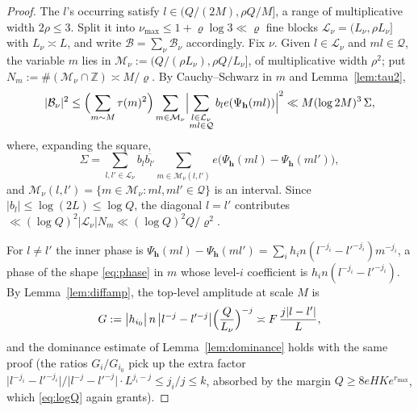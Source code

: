 \documentclass[11pt]{article}
\theoremstyle{definition}
\theoremstyle{plain}
\begin{document}
\begin{proof}
The $l$'s occurring satisfy $l\in(Q/(2M),\rho Q/M]$, a range of
multiplicative width $2\rho\le3$.  Split it into
$\nu_{\max}\le1+\varrho\log3\ll\varrho$ fine blocks
$\mathcal L_{\nu}=(L_{\nu},\rho L_{\nu}]$ with $L_{\nu}\asymp L$, and write
$\mathcal B=\sum_{\nu}\mathcal B_{\nu}$ accordingly.  Fix $\nu$.  Given
$l\in\mathcal L_{\nu}$ and $ml\in\mathcal Q$, the variable $m$ lies in
$\mathcal M_{\nu}:=(Q/(\rho L_{\nu}),\rho Q/L_{\nu}]$, of multiplicative
width $\rho^{2}$; put $N_{m}:=\#(\mathcal M_{\nu}\cap\mathbb Z)\asymp
M/\varrho$.  By Cauchy--Schwarz in $m$ and Lemma~\ref{lem:tau2},
\[
|\mathcal B_{\nu}|^{2}
\le\Bigl(\sum_{m\sim M}\tau(m)^{2}\Bigr)
\sum_{m\in\mathcal M_{\nu}}\Bigl|\sum_{\substack{l\in\mathcal L_{\nu}\\
ml\in\mathcal Q}}b_{l}e(\Psi_{\mathbf h}(ml))\Bigr|^{2}
\ll M(\log 2M)^{3}\,\Sigma,
\]
where, expanding the square,
\[
\Sigma=\sum_{l,l'\in\mathcal L_{\nu}}b_{l}\overline{b_{l'}}
\sum_{m\in\mathcal M_{\nu}(l,l')}
e\bigl(\Psi_{\mathbf h}(ml)-\Psi_{\mathbf h}(ml')\bigr),
\]
and $\mathcal M_{\nu}(l,l')=\{m\in\mathcal M_{\nu}:ml,ml'\in\mathcal Q\}$
is an interval.  Since $|b_{l}|\le\log(2L)\le\log Q$, the diagonal
$l=l'$ contributes $\ll(\log Q)^{2}|\mathcal L_{\nu}|N_{m}
\ll(\log Q)^{2}Q/\varrho^{2}$.

For $l\ne l'$ the inner phase is
$\Psi_{\mathbf h}(ml)-\Psi_{\mathbf h}(ml')
=\sum_{i}h_{i}n(l^{-j_{i}}-l'^{-j_{i}})m^{-j_{i}}$, a phase of the shape
\eqref{eq:phase} in $m$ whose level-$i$ coefficient is
$h_{i}n(l^{-j_{i}}-l'^{-j_{i}})$.  By Lemma~\ref{lem:diffamp}, the
top-level amplitude at scale $M$ is
\[
G:=\bigl|h_{i_{0}}\bigr|\,n\,\bigl|l^{-j}-l'^{-j}\bigr|
\Bigl(\frac{Q}{L_{\nu}}\Bigr)^{-j}\asymp F\,\frac{j|l-l'|}{L},
\]
and the dominance estimate of Lemma~\ref{lem:dominance} holds with the
same proof (the ratios $G_{i}/G_{i_{0}}$ pick up the extra factor
$\bigl|l^{-j_{i}}-l'^{-j_{i}}\bigr|/\bigl|l^{-j}-l'^{-j}\bigr|\cdot
L^{j_{i}-j}\le j_{i}/j\le k$, absorbed by the margin
$Q\ge8eHKe^{r_{\max}}$, which \eqref{eq:logQ} again grants).


\end{proof}
\end{document}

